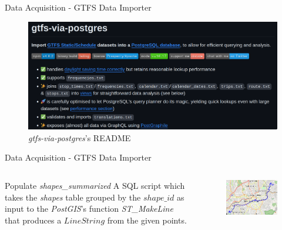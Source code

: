 \documentclass[xcolor=dvipsnames,table]{beamer}
\begin{document}
\begin{frame}{Data Acquisition - GTFS Data Importer}
        \begin{figure}
                \centering
                \includegraphics[width=\textwidth]{images/GTFS-via-postgres.png}
                \caption{\textit{gtfs-via-postgres}'s README}
        \end{figure}
\end{frame}

\begin{frame}{Data Acquisition - GTFS Data Importer}
        \begin{columns}
                \begin{block}{Populate {\em  shapes\_summarized}}
                        A SQL script which takes the \textit{shapes} table grouped by the $shape\_id$
                        as input to the \textit{PostGIS}'s function { \em ST\_MakeLine} that produces a $LineString$ from the given points.
                \end{block}
                \begin{figure}
                        \centering
                        \includegraphics[width=\textwidth]{images/route.png}
                \end{figure}
        \end{columns}
\end{frame}
\end{document}
